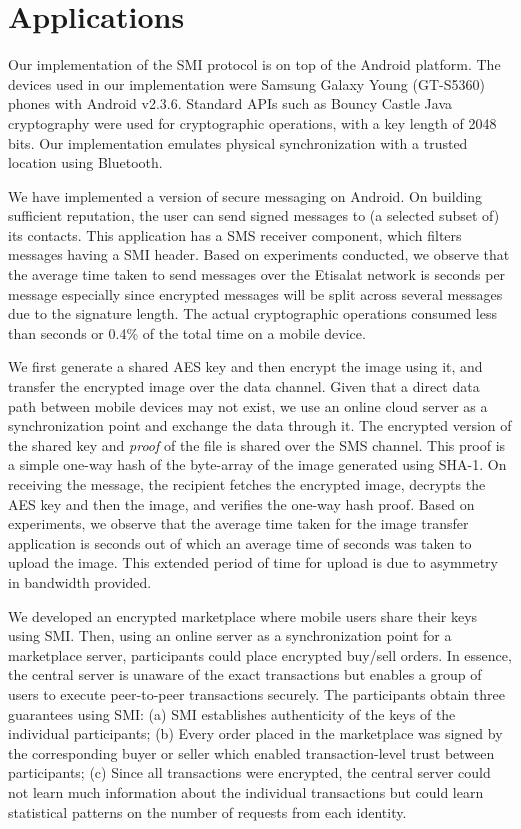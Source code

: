 \documentclass[letterpaper,twocolumn]{sig-alternate}
\begin{document}
 \section{Applications}
\label{impl}

Our implementation of the SMI protocol is on top of the Android platform. The devices used in our implementation were Samsung Galaxy Young (GT-S5360) phones with Android v2.3.6. Standard APIs such as Bouncy Castle Java cryptography were used for cryptographic operations, with a key length of 2048 bits. Our implementation emulates physical synchronization with a trusted location using Bluetooth. 

\vspace{1mm}
 We have implemented a version of secure messaging on Android. On building sufficient reputation, the user can send signed messages to (a selected subset of) its contacts. This application has a SMS receiver component, which filters messages having a SMI header. Based on experiments conducted, we observe that the average time taken to send messages over the Etisalat network is  seconds per message especially since encrypted messages will be split across several messages due to the signature length. The actual cryptographic operations consumed less than  seconds or 0.4\% of the total time on a mobile device.


\vspace{1mm}
 We first generate a shared AES key and then encrypt the image using it, and transfer the encrypted image over the data channel. Given that a direct data path between mobile devices may not exist, we use an online cloud server as a synchronization point and exchange the data through it. The encrypted version of the shared key and {\em proof} of the file is shared over the SMS channel. This proof is a simple one-way hash of the byte-array of the image generated using SHA-1. On receiving the message, the recipient fetches the encrypted image, decrypts the AES key and then the image, and verifies the one-way hash proof. Based on experiments, we observe that the average time taken for the image transfer application is  seconds out of which an average time of  seconds was taken to upload the image. This extended period of time for upload is due to asymmetry in bandwidth provided.

\vspace{1mm}
 We developed an encrypted marketplace where mobile users share their keys using SMI. Then, using an online server as a synchronization point for a marketplace server, participants could place encrypted buy/sell orders. In essence, the central server is unaware of the exact transactions but enables a group of users to execute peer-to-peer transactions securely. The participants obtain three guarantees using SMI: (a) SMI establishes authenticity of the keys of the individual participants; (b) Every order placed in the marketplace was signed by the corresponding buyer or seller which enabled transaction-level trust between participants; (c) Since all transactions were encrypted, the central server could not learn much information about the individual transactions but could learn statistical patterns on the number of requests from each identity.
\end{document}
